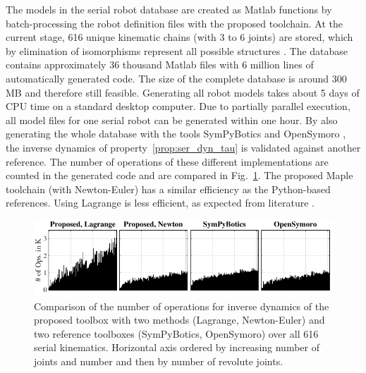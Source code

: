 \documentclass[runningheads]{llncs}
\begin{document}
The models in the serial robot database are created as Matlab functions by batch-processing the robot definition files with the proposed toolchain.
At the current stage, 616 unique kinematic chains (with 3 to 6 joints) are stored, which by elimination of isomorphisms represent all possible structures \cite{Ramirez2018}.
The database contains approximately 36 thousand Matlab files with 6 million lines of automatically generated code.
The size of the complete database is around 300\,MB and therefore still feasible. %
Generating all robot models takes about 5 days of CPU time on a standard desktop computer.
Due to partially parallel execution, all model files for one serial robot can be generated within one hour.
By also generating the whole database with the tools SymPyBotics \cite{SousaCor2012} and OpenSymoro \cite{KhalilVijKhoMuk2014}, the inverse dynamics of property~\ref{prop:ser_dyn_tau} is validated against another reference.
The number of operations of these different implementations are counted in the generated code and are compared in Fig.~\ref{fig:comparison_numops}.
The proposed Maple toolchain (with Newton-Euler) has a similar efficiency as the Python-based references.
Using Lagrange is less efficient, as expected from literature \cite{KhalilDom2002}.

\begin{figure}[b]
	\vspace{-0.4cm}
	\includegraphics{statistics_serrob_numops_histogram.pdf}
	\vspace{-0.8cm}
	\caption{Comparison of the number of operations for inverse dynamics of the proposed toolbox with two methods (Lagrange, Newton-Euler) and two reference toolboxes (SymPyBotics, OpenSymoro) over all 616 serial kinematics. Horizontal axis ordered by increasing number of joints and number and then by number of revolute joints.}
	\label{fig:comparison_numops}
\end{figure} 
\end{document}
